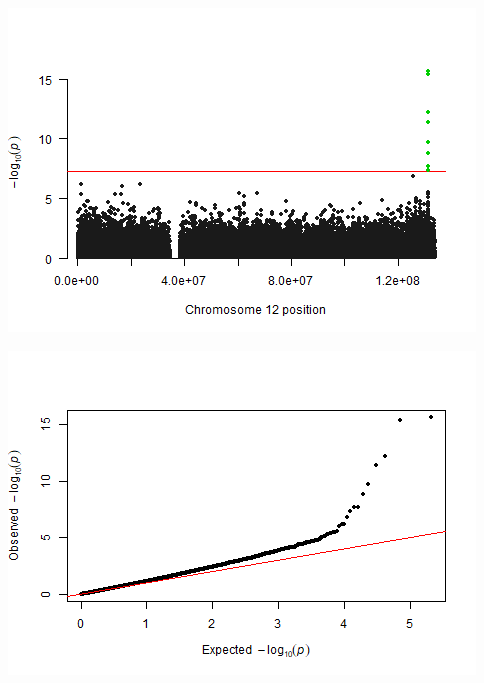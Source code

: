 \documentclass[
]{article}
\newenvironment{Shaded}{\begin{snugshade}}{\end{snugshade}}
\newcommand{\DataTypeTok}[1]{\textcolor[rgb]{0.13,0.29,0.53}{#1}}
\newcommand{\DecValTok}[1]{\textcolor[rgb]{0.00,0.00,0.81}{#1}}
\newcommand{\KeywordTok}[1]{\textcolor[rgb]{0.13,0.29,0.53}{\textbf{#1}}}
\newcommand{\NormalTok}[1]{#1}
\newcommand{\OperatorTok}[1]{\textcolor[rgb]{0.81,0.36,0.00}{\textbf{#1}}}
\begin{document}
\includegraphics{stats-gene-research-progress-v9_files/figure-latex/Agg-1.png}

\begin{Shaded}
\end{Shaded}

\includegraphics{stats-gene-research-progress-v9_files/figure-latex/Agg-2.png}

\begin{Shaded}
\end{Shaded}
\end{document}
